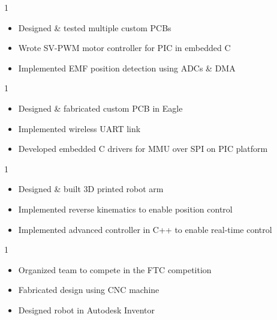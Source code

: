 \documentclass[10pt, letterpaper, ragged2e, withhyper]{AltaCV/altacv}
\def\CSMBLDC{0}		%
\def\CSMQUAD{0}		%
\def\LSROBO{0}		%
\def\FTCROBO{0}		%
\begin{document}
\begin{paracol}{2}
\if\CSMBLDC1
\divider
{}
\begin{itemize}
\item Designed \& tested multiple custom PCBs
\item Wrote SV-PWM motor controller for PIC in embedded C
\item Implemented EMF position detection using ADCs \& DMA
\end{itemize}
\fi

\if\CSMQUAD1
\divider
{}
\begin{itemize}
\item Designed \& fabricated custom PCB in Eagle
\item Implemented wireless UART link
\item Developed embedded C drivers for MMU over SPI on PIC platform
\end{itemize}
\fi

\if\LSROBO1
\divider

\begin{itemize}
\item Designed \& built 3D printed robot arm
\item Implemented reverse kinematics to enable position control
\item Implemented advanced controller in C++ to enable real-time control
\end{itemize}
\fi

\if\FTCROBO1

\divider

\begin{itemize}
\item Organized team to compete in the FTC competition
\item Fabricated design using CNC machine
\item Designed robot in Autodesk Inventor
\end{itemize}
\fi

\iffalse

\divider

\cvevent{Project name}{Where \& for what}{Aug. 20XX - Dec. 20XX}{}
\begin{itemize}
\item First
\item Second
\item Last
\end{itemize}
\fi


\end{paracol}
\end{document}
